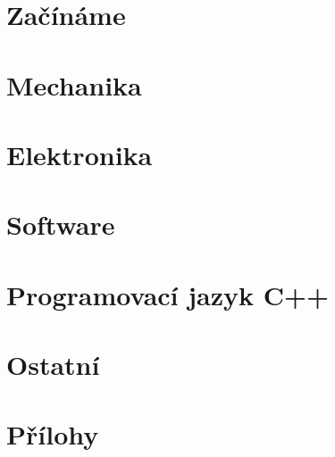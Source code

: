 \documentclass[12pt]{report} %
\begin{document}


\tableofcontents %

\chapter{Začínáme}
	
	
	
\chapter{Mechanika}
	

\chapter{Elektronika}
	
	
	
	
	
		
	
\chapter{Software}
	
	

\chapter{Programovací jazyk C++}
	
	
	
	

 
\chapter{Ostatní}
	
	


\chapter*{Přílohy}  
	
	
  \printindex %

\end{document}
